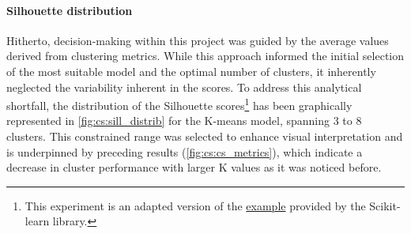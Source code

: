 \begin{figure}[!t]
    \label{fig:cs:cs_metrics_heatmap}
\end{figure}



\paragraph*{Silhouette distribution}

Hitherto, decision-making within this project was guided by the average values derived from clustering metrics. While this approach informed the initial selection of the most suitable model and the optimal number of clusters, it inherently neglected the variability inherent in the scores. To address this analytical shortfall, the distribution of the Silhouette scores\footnote{This experiment is an adapted version of the \href{https://tinyurl.com/sillhouete-distrib}{example} provided by the Scikit-learn library.} has been graphically represented in \cref{fig:cs:sill_distrib} for the K-means model, spanning 3 to 8 clusters. This constrained range was selected to enhance visual interpretation and is underpinned by preceding results (\cref{fig:cs:cs_metrics}), which indicate a decrease in cluster performance with larger K values as it was noticed before.


